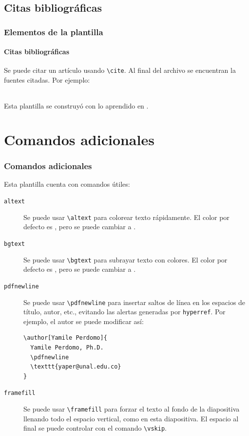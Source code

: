 \documentclass[aspectratio=169,usenames,dvipsnames,spanish]{beamer}
\begin{document}
\subsection{Citas bibliográficas}

\begin{frame}
\frametitle{Elementos de la plantilla}
\framesubtitle{Citas bibliográficas}
    Se puede citar un artículo usando \texttt{\textbackslash cite}. Al final del archivo se encuentran la fuentes citadas. Por ejemplo:\\\

    Esta plantilla se construyó con lo aprendido en \cite{Kor03}.
\end{frame}

\section{Comandos adicionales}

\begin{frame}[fragile]
\frametitle{Comandos adicionales}
Esta plantilla cuenta con comandos útiles:
\begin{description}
\item[\texttt{altext}] Se puede usar \texttt{\textbackslash altext} para colorear texto rápidamente. El color por defecto es , pero se puede cambiar a .
\item[\texttt{bgtext}] Se puede usar \texttt{\textbackslash bgtext} para subrayar texto con colores. El color por defecto es , pero se puede cambiar a .
\item[\texttt{pdfnewline}] Se puede usar \texttt{\textbackslash pdfnewline} para insertar saltos de línea en los espacios de título, autor, etc., evitando las alertas generadas por \texttt{hyperref}. Por ejemplo, el autor se puede modificar así:
\begin{verbatim}
\author[Yamile Perdomo]{
  Yamile Perdomo, Ph.D.
  \pdfnewline
  \texttt{yaper@unal.edu.co}
}
\end{verbatim}
\end{description}
\end{frame}

\begin{frame}[fragile]
    \framefill
    \begin{description}
        \item[\texttt{framefill}] Se puede usar \texttt{\textbackslash framefill} para forzar el texto al fondo de la diapositiva llenando todo el espacio vertical, como en esta diapositiva. El espacio al final se puede controlar con el comando \texttt{\textbackslash vskip}.
    \end{description}
    \vskip 1cm
\end{frame}
\end{document}
